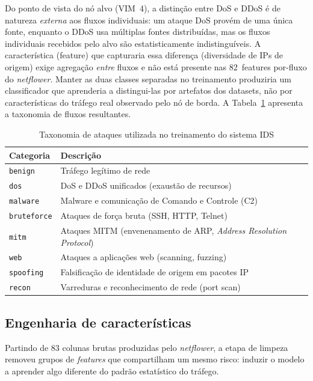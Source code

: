 \documentclass[12pt]{article}
\begin{document}
Do ponto de vista do nó alvo (VIM~4), a distinção entre DoS e DDoS é de natureza
\textit{externa} aos fluxos individuais: um ataque DoS provém de uma única fonte,
enquanto o DDoS usa múltiplas fontes distribuídas, mas os fluxos individuais
recebidos pelo alvo são estatisticamente indistinguíveis. A característica (feature) que capturaria
essa diferença (diversidade de IPs de origem) exige agregação \textit{entre} fluxos
e não está presente nas 82~features por-fluxo do \textit{netflower}. Manter as
duas classes separadas no treinamento produziria um classificador que aprenderia a
distingui-las por artefatos dos datasets, não por características do tráfego real
observado pelo nó de borda. A Tabela~\ref{tab:taxonomy} apresenta a taxonomia de fluxos resultantes. 

\begin{table}[ht]
\centering
\caption{Taxonomia de ataques utilizada no treinamento do sistema IDS}
\label{tab:taxonomy}
\begin{tabular}{@{}ll@{}}
\toprule
\textbf{Categoria} & \textbf{Descrição} \\ \midrule
\texttt{benign}     & Tráfego legítimo de rede \\
\texttt{dos}        & DoS e DDoS unificados (exaustão de recursos) \\
\texttt{malware}    & Malware e comunicação de Comando e Controle (C2) \\
\texttt{bruteforce} & Ataques de força bruta (SSH, HTTP, Telnet) \\
\texttt{mitm}       & Ataques MITM (envenenamento de ARP, \textit{Address Resolution Protocol}) \\
\texttt{web}        & Ataques a aplicações web (scanning, fuzzing) \\
\texttt{spoofing}   & Falsificação de identidade de origem em pacotes IP \\
\texttt{recon}      & Varreduras e reconhecimento de rede (port scan) \\ \bottomrule
\end{tabular}
\end{table}

\subsection{Engenharia de características}
\label{subsec:features}

Partindo de 83 colunas brutas produzidas pelo \textit{netflower}, a etapa de
limpeza removeu grupos de \textit{features} que compartilham um mesmo risco:
induzir o modelo a aprender algo diferente do padrão estatístico do tráfego.
\end{document}
